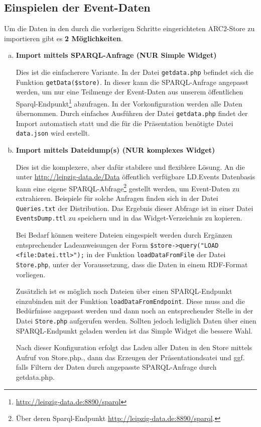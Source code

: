 \documentclass[11pt,a4paper]{article}
\begin{document}
\subsection{Einspielen der Event-Daten}
Um die Daten in den durch die vorherigen Schritte eingerichteten ARC2-Store zu
importieren gibt es \textbf{2 Möglichkeiten}.
\begin{enumerate}[a)]
\item \textbf{Import mittels SPARQL-Anfrage (NUR Simple Widget)}

  Dies ist die einfacherere Variante. In der Datei
  \texttt{getdata.php} befindet sich die Funktion \texttt{getData(\$store)}.
  In dieser kann die SPARQL-Anfrage angepasst werden, um nur eine Teilmenge der
  Event-Daten aus unserem öffentlichen
  Sparql-Endpunkt\footnote{\url{http://leipzig-data.de:8890/sparql}}
  abzufragen. In der Vorkonfiguration werden alle Daten übernommen. Durch
  einfaches Ausführen der Datei \texttt{getdata.php} findet der Import
  automatisch statt und die für die Präsentation benötigte Datei \texttt{data.json} wird erstellt.

\item \textbf{Import mittels Dateidump(s) (NUR komplexes Widget)}

Dies ist die komplexere, aber dafür stabilere und flexiblere Lösung.  An die unter
\url{http://leipzig-data.de/Data} öffentlich verfügbare LD.Events Datenbasis
kann eine eigene SPARQL-Abfrage\footnote{Über deren Sparql-Endpunkt
  \url{http://leipzig-data.de:8890/sparql}.} gestellt werden, um Event-Daten
zu extrahieren.  Beispiele für solche Anfragen finden sich in der Datei
\texttt{Queries.txt} der Distribution.  Das Ergebnis dieser Abfrage ist in
einer Datei \texttt{EventsDump.ttl} zu speichern und in das Widget-Verzeichnis
zu kopieren. 

Bei Bedarf können weitere Dateien eingespielt werden durch Ergänzen entsprechender Ladeanweisungen der Form \verb!$store->query("LOAD <file:Datei.ttl>");! in der Funktion \texttt{loadDataFromFile} der Datei \texttt{Store.php}, unter der Voraussetzung, dass die Daten
in einem RDF-Format vorliegen.

Zusätzlich ist es möglich noch Dateien über einen SPARQL-Endpunkt einzubinden mit der Funktion \texttt{loadDataFromEndpoint}. Diese muss and die Bedürfnisse angepasst werden und dann noch an entsprechender Stelle in der Datei \texttt{Store.php} aufgerufen werden. Sollten jedoch lediglich Daten über einen SPARQL-Endpunkt geladen werden ist das Simple Widget die bessere Wahl.

Nach dieser Konfiguration erfolgt das Laden aller Daten in den Store mittels Aufruf von Store.php., dann das Erzeugen der Präsentationdsatei und ggf. falls Filtern der Daten durch angepasste SPARQL-Anfrage durch getdata.php.
\end{enumerate}
\end{document}
